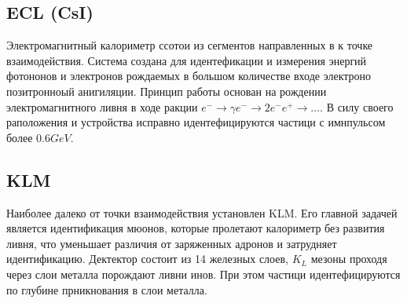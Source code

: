\subsection{ECL (CsI)}

Электромагнитный калориметр ссотои из сегментов направленных в к точке взаимодействия. 
Система создана для идентефикации и измерения энергий фотононов и электронов 
рождаемых в большом количестве входе электроно позитронноый анигиляции. 
Принцип работы основан на рождении электромагнитного ливня в ходе ракции
$e^- \to \gamma e^- \to 2e^- e^+ \to ...$. В силу своего раположения и устройства 
исправно идентефицируются частици с имнпульсом более $0.6 GeV$.

\subsection{KLM}

Наиболее далеко от точки взаимодействия установлен KLM. Его главной задачей
является идентификация мюонов, которые пролетают калориметр без развития 
ливня, что уменьшает различия от заряженных адронов и затрудняет идентификацию.
Дектектор состоит из 14 железных слоев, $K_L$ мезоны проходя через слои металла
порождают ливни инов. При этом частици идентефицируются по глубине прникнования 
в слои металла. 




